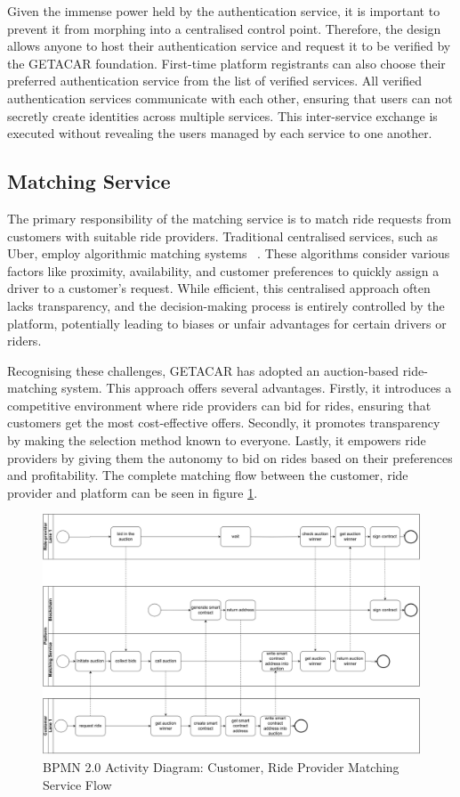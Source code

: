 Given the immense power held by the authentication service, it is important to prevent it from morphing into a centralised control point. Therefore, the design allows anyone to host their authentication service and request it to be verified by the GETACAR foundation. First-time platform registrants can also choose their preferred authentication service from the list of verified services. All verified authentication services communicate with each other, ensuring that users can  not secretly create identities across multiple services. This inter-service exchange is executed without revealing the users managed by each service to one another. 

\subsection{Matching Service}\label{subsec:MatchingService}
The primary responsibility of the matching service is to match ride requests from customers with suitable ride providers. Traditional centralised services, such as Uber, employ algorithmic matching systems ~\cite{Uber.}. These algorithms consider various factors like proximity, availability, and customer preferences to quickly assign a driver to a customer's request. While efficient, this centralised approach often lacks transparency, and the decision-making process is entirely controlled by the platform, potentially leading to biases or unfair advantages for certain drivers or riders.

Recognising these challenges, GETACAR has adopted an auction-based ride-matching system. This approach offers several advantages. Firstly, it introduces a competitive environment where ride providers can bid for rides, ensuring that customers get the most cost-effective offers. Secondly, it promotes transparency by making the selection method known to everyone. Lastly, it empowers ride providers by giving them the autonomy to bid on rides based on their preferences and profitability. The complete matching flow between the customer, ride provider and platform can be seen in figure \ref{fig:maching}.

\begin{figure}[h]
    \centering
    \includegraphics[width=\linewidth]{data/5.svg}
    \caption{BPMN 2.0 Activity Diagram: Customer, Ride Provider Matching Service Flow}
    \label{fig:maching}
\end{figure}


